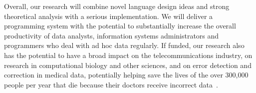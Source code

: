 \documentclass[11pt]{article}
\begin{document}

Overall, our research will combine novel language design ideas and
strong theoretical analysis with a serious implementation.  We will
deliver a programming system with the potential to substantially
increase the overall productivity of data analysts, 
information systems administrators
and programmers who
deal with ad hoc data regularly.  If funded, 
our research also has the potential to have  a
broad impact on the telecommunications industry, on
research in computational biology and other sciences,
and on error detection and correction in 
medical data, potentially helping save the lives of
the over 300,000 people per year that die because their doctors
receive incorrect data~\cite{rudlin:pc}.
\end{document}

